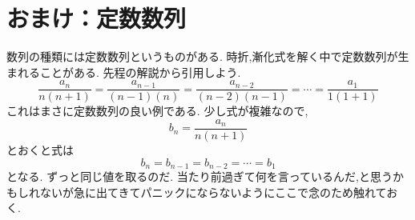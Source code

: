 
\section{おまけ：定数数列}
数列の種類には定数数列というものがある.
時折,漸化式を解く中で定数数列が生まれることがある.
先程の解説から引用しよう.
\[
  \frac{a_{n}}{n(n+1)}=\frac{a_{n-1}}{(n-1)(n)}=\frac{a_{n-2}}{(n-2)(n-1)}=\cdots=\frac{a_{1}}{1(1+1)}
\]
これはまさに定数数列の良い例である.
少し式が複雑なので,
\[
  b_n=\frac{a_{n}}{n(n+1)}
\]
とおくと式は
\[
  b_n=b_{n-1}=b_{n-2}=\cdots=b_1
\]
となる.
ずっと同じ値を取るのだ.
当たり前過ぎて何を言っているんだ,と思うかもしれないが急に出てきてパニックにならないようにここで念のため触れておく.
